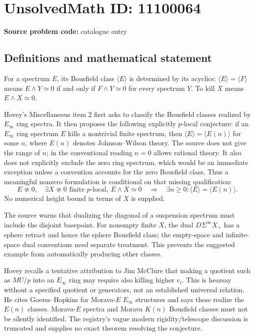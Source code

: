 \documentclass[11pt]{article}
\begin{document}
\section*{UnsolvedMath ID: 11100064}
\textbf{Source problem code:} catalogue entry
\subsection{Definitions and mathematical statement}
For a spectrum $E$, its Bousfield class $\langle E\rangle$ is determined by its acyclics: $\langle E\rangle=\langle F\rangle$ means $E\wedge Y\simeq0$ if and only if $F\wedge Y\simeq0$ for every spectrum $Y$. To kill $X$ means $E\wedge X\simeq0$.

Hovey's Miscellaneous item 2 first asks to classify the Bousfield classes realized by $E_\infty$ ring spectra. It then proposes the following explicitly $p$-local conjecture: if an $E_\infty$ ring spectrum $E$ kills a nontrivial finite spectrum, then $\langle E\rangle=\langle E(n)\rangle$ for some $n$, where $E(n)$ denotes Johnson--Wilson theory. The source does not give the range of $n$; in the conventional reading $n=0$ allows rational theory. It also does not explicitly exclude the zero ring spectrum, which would be an immediate exception unless a convention accounts for the zero Bousfield class. Thus a meaningful nonzero formulation is conditional on that missing qualification:
\[
 E\not\simeq0,\quad\exists X\not\simeq0\text{ finite $p$-local},\ E\wedge X\simeq0
 \quad\Longrightarrow\quad
 \exists n\geq0:\langle E\rangle=\langle E(n)\rangle.
\]
No numerical height bound in terms of $X$ is supplied.

The source warns that dualizing the diagonal of a suspension spectrum must include the disjoint basepoint. For nonempty finite $X$, the dual $D\Sigma^\infty X_+$ has a sphere retract and hence the sphere Bousfield class; the empty-space and infinite-space dual conventions need separate treatment. This prevents the suggested example from automatically producing other classes.

Hovey recalls a tentative attribution to Jim McClure that making a quotient such as $MU/p$ into an $E_\infty$ ring may require also killing higher $v_i$. This is hearsay without a specified quotient or generators, not an established universal relation. He cites Goerss--Hopkins for Morava-$E$ $E_\infty$ structures and says these realize the $E(n)$ classes. Morava-$E$ spectra and Morava $K(n)$ Bousfield classes must not be silently identified. The registry's vague modern rigidity/telescope discussion is truncated and supplies no exact theorem resolving the conjecture.
\end{document}
